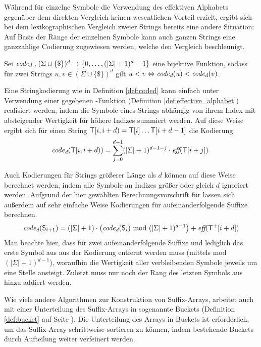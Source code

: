Während für einzelne Symbole die Verwendung des effektiven Alphabets gegenüber dem direkten Vergleich keinen wesentlichen Vorteil erzielt, ergibt sich bei dem lexikographischen Vergleich zweier Strings bereits eine andere Situation: Auf Basis der Ränge der einzelnen Symbole kann auch ganzen Strings eine ganzzahlige Codierung zugewiesen werden, welche den Vergleich beschleunigt.

\begin{definition}[Stringkodierung]
	\label{def:coded}
	Sei \(\textit{code\textsubscript{d}} : (\Sigma \cup \{\$\})^d \rightarrow \{0, \ldots, (|\Sigma| + 1)^d - 1\}\) eine bijektive Funktion, sodass für zwei Strings \(u, v \in (\Sigma \cup \{\$\})^d\) gilt \(u < v \Leftrightarrow \textit{code\textsubscript{d}}(u) < \textit{code\textsubscript{d}}(v)\).
\end{definition}

Eine Stringkodierung wie in Definition \ref{def:coded} kann einfach unter Verwendung einer gegebenen \effective-Funktion (Definition \ref{def:effective_alphabet}) realisiert werden, indem die Symbole eines Strings abhängig von ihrem Index mit absteigender Wertigkeit für höhere Indizes summiert werden. Auf diese Weise ergibt sich für einen String \(\inputtext{[i,i+d)} = \inputtext[i] \ldots \inputtext[i + d - 1]\) die Kodierung \[\coded(\inputtext{[i,i+d)}) = \sum_{j=0}^{d - 1} (|\Sigma| + 1)^{d - 1 - j} \cdot \effective(\inputtext[i + j]).\]\par\smallskip
Auch Kodierungen für Strings größerer Länge als \(d\) können auf diese Weise berechnet werden, indem alle Symbole an Indizes größer oder gleich \(d\) ignoriert werden. Aufgrund der hier gewählten Berechnungsvorschrift für \coded lassen sich außerdem auf sehr einfache Weise Kodierungen für aufeinanderfolgende Suffixe berechnen.
\begin{equation}
	\label{eq:coded}
    \coded(\suffix{i+1}) = (|\Sigma| + 1) \cdot \left( \coded(\suffix{i}) \text{ mod } (|\Sigma| + 1)^{d-1}\right) + \effective(\inputtextplus[i+d])
\end{equation}
Man beachte hier, dass für zwei aufeinanderfolgende Suffixe  und  lediglich das erste Symbol aus  aus der Kodierung entfernt werden muss (mittels mod \((|\Sigma| + 1)^{d-1}\)), woraufhin die Wertigkeit aller verbleibenden Symbole jeweils um eine Stelle ansteigt. Zuletzt muss nur noch der Rang des letzten Symbols aus  hinzu addiert werden.\par\smallskip
Wie viele andere Algorithmen zur Konstruktion von Suffix-Arrays, arbeitet auch \bpr mit einer Unterteilung des Suffix-Arrays in sogenannte Buckets (Definition \ref{def:bucket} auf Seite \pageref{def:bucket}). Die Unterteilung des Arrays in Buckets ist erforderlich, um das Suffix-Array schrittweise sortieren zu können, indem bestehende Buckets durch Aufteilung weiter verfeinert werden.
